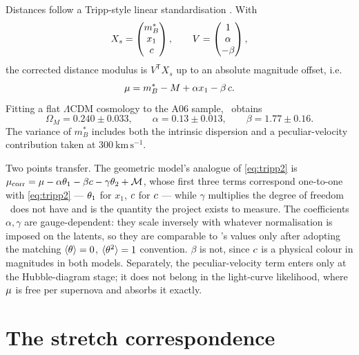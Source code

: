 \documentclass[11pt]{article}
\begin{document}
Distances follow a Tripp-style linear standardisation \citep{Tripp1998}. With
\begin{equation}
  X_{s} = \begin{pmatrix} m^{*}_{B} \\ x_{1} \\ c \end{pmatrix},
  \qquad
  V = \begin{pmatrix} 1 \\ \alpha \\ -\beta \end{pmatrix},
\end{equation}
the corrected distance modulus is $V^{\mathsf{T}}X_{s}$ up to an absolute
magnitude offset, i.e.
\begin{equation}
  \mu = m^{*}_{B} - M + \alpha x_{1} - \beta\,c .
  \label{eq:tripp2}
\end{equation}
Fitting a flat $\Lambda$CDM cosmology to the A06 sample, \salt\ obtains
\begin{equation}
  \Omega_{M} = 0.240 \pm 0.033, \qquad
  \alpha = 0.13 \pm 0.013, \qquad
  \beta = 1.77 \pm 0.16 .
\end{equation}
The variance of $m^{*}_{B}$ includes both the intrinsic dispersion and a
peculiar-velocity contribution taken at $300\ \mathrm{km\,s^{-1}}$.

Two points transfer. The geometric model's analogue of \eqref{eq:tripp2} is
$\mu_{\mathrm{corr}} = \mu - \alpha\theta_{1} - \beta c - \gamma\theta_{2}
+ \mathcal{M}$, whose first three terms correspond one-to-one with
\eqref{eq:tripp2} --- $\theta_{1}$ for $x_{1}$, $c$ for $c$ --- while
$\gamma$ multiplies the degree of freedom \salt\ does not have and is the
quantity the project exists to measure. The coefficients $\alpha, \gamma$ are
gauge-dependent: they scale inversely with whatever normalisation is imposed on
the latents, so they are comparable to \salt's values only after adopting the
matching $\langle\theta\rangle=0$, $\langle\theta^{2}\rangle=1$ convention.
$\beta$ is not, since $c$ is a physical colour in magnitudes in both models. Separately, the peculiar-velocity term
enters only at the Hubble-diagram stage; it does not belong in the light-curve
likelihood, where $\mu$ is free per supernova and absorbs it exactly.

\section{The stretch correspondence}
\end{document}
